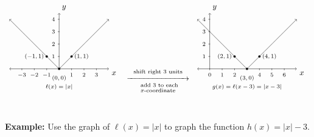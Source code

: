 \documentclass[12pt]{article}
\theoremstyle{definition}
\begin{document}
\[ \begin{array}{ccc}

\begin{tikzpicture}[xscale=0.55,yscale=0.55]
	\draw [<->](-4,0) -- coordinate (x axis mid) (4,0) node[below right] {$x$};
	\draw [<->](0,0) -- coordinate (x axis mid) (0,4.5) node[above right] {$y$};
	\draw [->] plot [domain=0:4, samples=100] (\x,{\x});
	\draw [->] plot [domain=0:-4, samples=100] (\x,{-\x});
	\draw[fill] (-1,1) circle (0.08);
	\draw[fill] (1,1) circle (0.08);
	\draw[fill] (0,0) circle (0.08);
	\foreach \x in {-3,...,-1}
	\draw (\x,1pt) -- (\x,-3pt)
	node[anchor=north] {\scriptsize $\x$};
	\foreach \x in {1,...,3}
	\draw (\x,1pt) -- (\x,-3pt)
	node[anchor=north] {\scriptsize $\x$};
	\foreach \y in {1,...,4}
	\draw (1pt,\y) -- (-3pt,\y) 
	node[anchor=east] {\scriptsize $\y$};
	\draw (1,1) node[right] {\scriptsize $(1,1)$}; 
	\draw (-1,1) node[left] {\scriptsize $(-1,1)$}; 
	\draw (0,-0.3) node[below] {\scriptsize $(0,0)$}; 
	\draw (0,-1) node[below] {\scriptsize $\ell(x)=|x|$};  
\end{tikzpicture}
&

\stackrel{\stackrel{\mbox{\scriptsize shift right $3$ units}}{\xrightarrow{\hspace{1in}}}}{\stackrel{\mbox{ \scriptsize add $3$ to each}}{\mbox{\scriptsize $x$-coordinate}}} 

&

\begin{tikzpicture}[xscale=0.55,yscale=0.55]
	\draw [<->](-1,0) -- coordinate (x axis mid) (7,0) node[below right] {$x$};
	\draw [->](0,0) -- coordinate (x axis mid) (0,4.5) node[above right] {$y$};
	\draw [->] plot [domain=3:7, samples=100] (\x,{\x-3});
	\draw [->] plot [domain=3:-1, samples=100] (\x,{-\x+3});
	\draw[fill] (2,1) circle (0.08);
	\draw[fill] (4,1) circle (0.08);
	\draw[fill] (3,0) circle (0.08);
	\foreach \x in {0,1,2,4,5,6}
	\draw (\x,1pt) -- (\x,-3pt)
	node[anchor=north] {\scriptsize $\x$};
	\foreach \y in {1,...,4}
	\draw (1pt,\y) -- (-3pt,\y) 
	node[anchor=east] {\scriptsize $\y$};
	\draw (4,1) node[right] {\scriptsize $(4,1)$}; 
	\draw (2,1) node[left] {\scriptsize $(2,1)$}; 
	\draw (3,-0.3) node[below] {\scriptsize $(3,0)$}; 
	\draw (3,-1) node[below] {\scriptsize $g(x)=\ell(x-3)=|x-3|$};  
\end{tikzpicture}
\end{array}\]
\ \par
{\bf Example:} Use the graph of $\ell(x) = |x|$ to graph the function $h(x) = |x|-3$.\\
\ \par
\end{document}
